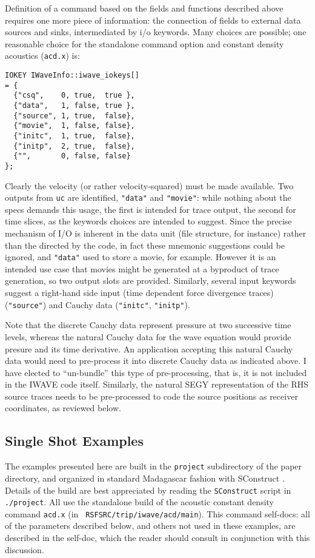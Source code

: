 Definition of a command based on the fields and functions described
above requires one more piece of information: the connection of
fields to external data sources and sinks, intermediated by i/o
keywords. Many choices are possible; one reasonable choice for the 
standalone command option and constant density acoustics ({\tt acd.x})
is:
\begin{verbatim}
IOKEY IWaveInfo::iwave_iokeys[]
= {
  {"csq",    0, true,  true },
  {"data",   1, false, true },
  {"source", 1, true,  false},
  {"movie",  1, false, false},
  {"initc",  1, true,  false},
  {"initp",  2, true,  false},
  {"",       0, false, false}
};
\end{verbatim}
Clearly the velocity (or rather velocity-squared) must be made
available. Two outputs from {\tt uc} are identified, {\tt "data"}
and {\tt "movie"}: while nothing about the specs demands this usage,
the first is intended for trace output, the second for time slices,
as the keywords choices are intended to suggest. Since the precise
mechanism of I/O is inherent in the data unit (file structure, for
instance) rather than the directed by the code, in fact these mnemonic
suggestions could be ignored, and {\tt "data"} used to store a
movie, for example. However it is an intended use case that movies
might be generated at a byproduct of trace generation, so two output
slots are provided. Similarly, several input keywords 
suggest a right-hand side input (time dependent force divergence
traces) ({\tt "source"}) and Cauchy data ({\tt "initc"}, {\tt "initp"}).

Note that the discrete Cauchy data represent pressure at two successive time levels,
whereas the natural Cauchy data for the wave equation would provide
presure and its time derivative. An application accepting this natural
Cauchy data would need to pre-process it into discrete Cauchy data as
indicated above. I have elected to ``un-bundle'' this type of
pre-processing, that is, it is not included in the IWAVE code
itself. Similarly, the natural SEGY representation of the RHS source
traces needs to be pre-processed to code the source positions as
receiver coordinates, as reviewed below.

\subsection{Single Shot Examples}
The examples presented here are built in the {\tt project} subdirectory of the
paper directory, and organized in standard Madagascar
fashion with SConstruct \cite[]{Madagascar}. Details of the build are best
appreciated by reading the {\tt SConstruct} script in {\tt
  ./project}. All use the standalone build of the acoustic constant
density command {\tt acd.x} (in {\tt
  RSFSRC/trip/iwave/acd/main}). This command self-docs: all of the
parameters described below, and others not used in these examples, are
described in the self-doc, which the reader should consult in
conjunction with this discussion.

